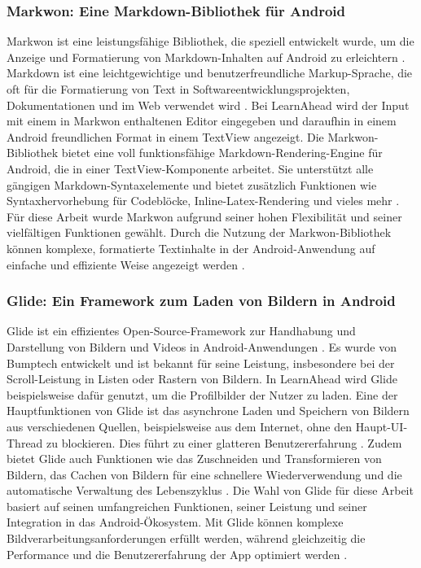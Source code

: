 \subsubsection{Markwon: Eine Markdown-Bibliothek für Android}
Markwon ist eine leistungsfähige Bibliothek, die speziell entwickelt wurde, um die Anzeige und Formatierung von Markdown-Inhalten auf Android zu erleichtern \cite{Markwon2022}. Markdown ist eine leichtgewichtige und benutzerfreundliche Markup-Sprache, die oft für die Formatierung von Text in Softwareentwicklungsprojekten, Dokumentationen und im Web verwendet wird \cite{Gruber2004}. \newline
Bei LearnAhead wird der Input mit einem in Markwon enthaltenen Editor eingegeben und daraufhin in einem Android freundlichen Format in einem TextView angezeigt. \newline
Die Markwon-Bibliothek bietet eine voll funktionsfähige Markdown-Rendering-Engine für Android, die in einer TextView-Komponente arbeitet. Sie unterstützt alle gängigen Markdown-Syntaxelemente und bietet zusätzlich Funktionen wie Syntaxhervorhebung für Codeblöcke, Inline-Latex-Rendering und vieles mehr \cite{Markwon2022}. \newline
Für diese Arbeit wurde Markwon aufgrund seiner hohen Flexibilität und seiner vielfältigen Funktionen gewählt. Durch die Nutzung der Markwon-Bibliothek können komplexe, formatierte Textinhalte in der Android-Anwendung auf einfache und effiziente Weise angezeigt werden \cite{Markwon2022}. \newline
\subsubsection{Glide: Ein Framework zum Laden von Bildern in Android}
Glide ist ein effizientes Open-Source-Framework zur Handhabung und Darstellung von Bildern und Videos in Android-Anwendungen \cite{Glide2022}. Es wurde von Bumptech entwickelt und ist bekannt für seine Leistung, insbesondere bei der Scroll-Leistung in Listen oder Rastern von Bildern. \newline
In LearnAhead wird Glide beispielsweise dafür genutzt, um die Profilbilder der Nutzer zu laden. Eine der Hauptfunktionen von Glide ist das asynchrone Laden und Speichern von Bildern aus verschiedenen Quellen, beispielsweise aus dem Internet, ohne den Haupt-UI-Thread zu blockieren. Dies führt zu einer glatteren Benutzererfahrung \cite{Glide2022}. Zudem bietet Glide auch Funktionen wie das Zuschneiden und Transformieren von Bildern, das Cachen von Bildern für eine schnellere Wiederverwendung und die automatische Verwaltung des Lebenszyklus \cite{GlideGithub2022}. \newline
Die Wahl von Glide für diese Arbeit basiert auf seinen umfangreichen Funktionen, seiner Leistung und seiner Integration in das Android-Ökosystem. Mit Glide können komplexe Bildverarbeitungsanforderungen erfüllt werden, während gleichzeitig die Performance und die Benutzererfahrung der App optimiert werden \cite{Glide2022}. \newline
